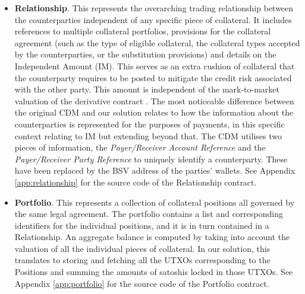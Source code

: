 \begin{itemize}
    \item \textbf{Relationship}. This represents the overarching trading relationship between the counterparties independent of any specific piece of collateral. It includes references to multiple collateral portfolios, provisions for the collateral agreement (such as the type of eligible collateral, the collateral types accepted by the counterparties, or the substitution provisions) and details on the Independent Amount (IM). This serves as an extra cushion of collateral that the counterparty requires to be posted to mitigate the credit risk associated with the other party. This amount is independent of the mark-to-market valuation of the derivative contract \citep{IM}. The most noticeable difference between the original CDM and our solution relates to how the information about the counterparties is represented for the purposes of payments, in this specific context relating to IM but extending beyond that. The CDM utilises two pieces of information, the \textit{Payer/Receiver Account Reference} and the \textit{Payer/Receiver Party Reference} to uniquely identify a counterparty. These have been replaced by the BSV address of the parties' wallets. See Appendix \ref{app:relationship} for the source code of the Relationship contract.

    \item \textbf{Portfolio}. This represents a collection of collateral positions all governed by the same legal agreement. The portfolio contains a list and corresponding identifiers for the individual positions, and it is in turn contained in a Relationship. An aggregate balance is computed by taking into account the valuation of all the individual pieces of collateral. In our solution, this translates to storing and fetching all the UTXOs corresponding to the Positions and summing the amounts of satoshis locked in those UTXOs. See Appendix \ref{app:portfolio} for the source code of the Portfolio contract.


\end{itemize}
